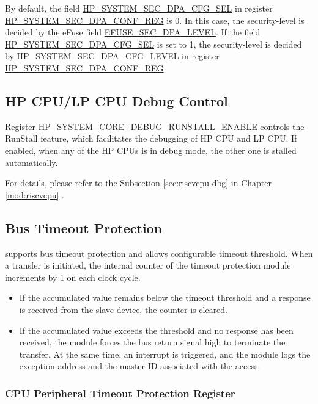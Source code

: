 \documentclass[main\_\_EN.tex]{subfiles}
\begin{document}
By default, the field \hyperref[fielddesc:HPSYSTEMSECDPALEVEL]{HP\_SYSTEM\_SEC\_DPA\_CFG\_SEL} in register \hyperref[regdesc:HPSYSTEMSECDPACONFREG]{HP\_SYSTEM\_SEC\_DPA\_CONF\_REG} is 0. In this case, the security-level is decided by the eFuse field \hyperref[fielddesc:EFUSESECDPALEVEL]{EFUSE\_SEC\_DPA\_LEVEL}. If the field \hyperref[fielddesc:HPSYSTEMSECDPALEVEL]{HP\_SYSTEM\_SEC\_DPA\_CFG\_SEL} is set to 1, the security-level is decided by \hyperref[fielddesc:HPSYSTEMSECDPALEVEL]{HP\_SYSTEM\_SEC\_DPA\_CFG\_LEVEL} in register \hyperref[regdesc:HPSYSTEMSECDPACONFREG]{HP\_SYSTEM\_SEC\_DPA\_CONF\_REG}.


\subsection{HP CPU/LP CPU Debug Control}

Register \hyperref[fielddesc:HPSYSTEMCOREDEBUGRUNSTALLENABLE]{HP\_SYSTEM\_CORE\_DEBUG\_RUNSTALL\_ENABLE} controls the RunStall feature, which facilitates the debugging of HP CPU and LP CPU. If enabled, when any of the HP CPUs is in debug mode, the other one is stalled automatically.

For details, please refer to the Subsection \ref{sec:riscvcpu-dbg} \textit{} in Chapter \ref{mod:riscvcpu} \textit{}.

\subsection{Bus Timeout Protection}

\chipname{} supports bus timeout protection and allows configurable timeout threshold. When a transfer is initiated, the internal counter of the timeout protection module increments by 1 on each clock cycle.
\begin{itemize}
    \item If the accumulated value remains below the timeout threshold and a response is received from the slave device, the counter is cleared.
    \item If the accumulated value exceeds the threshold and no response has been received, the module forces the bus return signal high to terminate the transfer. At the same time, an interrupt is triggered, and the module logs the exception address and the master ID associated with the access.
\end{itemize}


\subsubsection{CPU Peripheral Timeout Protection Register}
\end{document}
